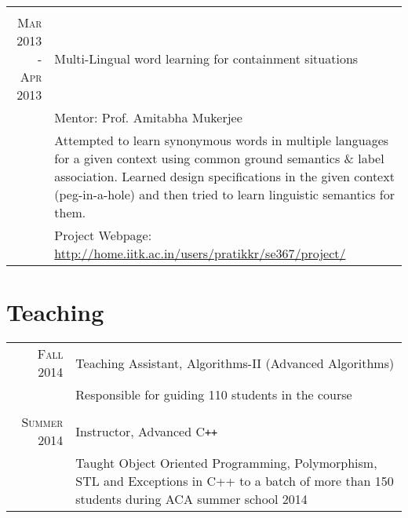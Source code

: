\documentclass[a4paper,10pt]{article}
\begin{document}
\begin{longtable}{r|p{12cm}}
\multicolumn{2}{c}{}\\
\textsc{Mar 2013 - Apr 2013} & Multi-Lingual word learning for containment situations\\
& \small{Mentor: Prof. Amitabha Mukerjee}\\
& \small{Attempted to learn synonymous words in multiple languages for a given context using common ground semantics \& label association. Learned design specifications in the given context (peg-in-a-hole) and then tried to learn linguistic semantics for them. }\\
&\small{Project Webpage: \href{http://home.iitk.ac.in/users/pratikkr/se367/project/}{http://home.iitk.ac.in/users/pratikkr/se367/project/}}\\

\end{longtable}


\section{Teaching}
\begin{tabular}{r|p{12cm}}
 \textsc{Fall 2014} & Teaching Assistant, Algorithms-II (Advanced Algorithms)\\
 &\small{Responsible for guiding 110 students in the course}\\ %
 \multicolumn{2}{c}{} \\
 \textsc{Summer 2014} & Instructor, Advanced C\texttt{++}\\
 &\small{Taught Object Oriented Programming, Polymorphism, STL and Exceptions in C++ to a batch of more than 150 students during ACA summer school 2014}\\ %
\end{tabular}
\end{document}
